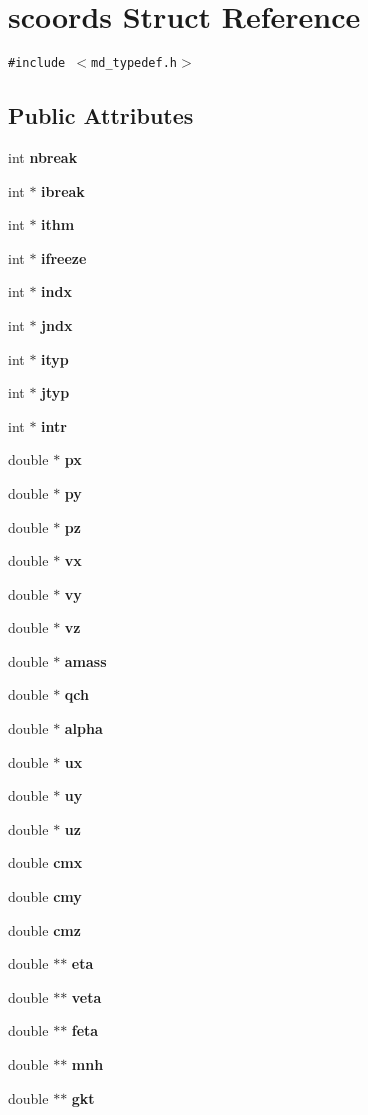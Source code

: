 \section{scoords Struct Reference}
\label{structscoords}
{\tt \#include $<$md\_\-typedef.h$>$}

\subsection*{Public Attributes}
\begin{CompactItemize}
\item 
int {\bf nbreak}
\item 
int $\ast$ {\bf ibreak}
\item 
int $\ast$ {\bf ithm}
\item 
int $\ast$ {\bf ifreeze}
\item 
int $\ast$ {\bf indx}
\item 
int $\ast$ {\bf jndx}
\item 
int $\ast$ {\bf ityp}
\item 
int $\ast$ {\bf jtyp}
\item 
int $\ast$ {\bf intr}
\item 
double $\ast$ {\bf px}
\item 
double $\ast$ {\bf py}
\item 
double $\ast$ {\bf pz}
\item 
double $\ast$ {\bf vx}
\item 
double $\ast$ {\bf vy}
\item 
double $\ast$ {\bf vz}
\item 
double $\ast$ {\bf amass}
\item 
double $\ast$ {\bf qch}
\item 
double $\ast$ {\bf alpha}
\item 
double $\ast$ {\bf ux}
\item 
double $\ast$ {\bf uy}
\item 
double $\ast$ {\bf uz}
\item 
double {\bf cmx}
\item 
double {\bf cmy}
\item 
double {\bf cmz}
\item 
double $\ast$$\ast$ {\bf eta}
\item 
double $\ast$$\ast$ {\bf veta}
\item 
double $\ast$$\ast$ {\bf feta}
\item 
double $\ast$$\ast$ {\bf mnh}
\item 
double $\ast$$\ast$ {\bf gkt}
$$
\end{CompactItemize}
